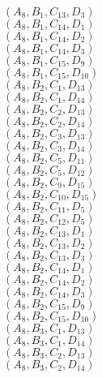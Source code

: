 \documentclass[14pt]{article}
\begin{document}
    $({A}_{8}, {B}_{1}, {C}_{13}, {D}_{3}) $ \\ 
    $({A}_{8}, {B}_{1}, {C}_{14}, {D}_{1}) $ \\ 
    $({A}_{8}, {B}_{1}, {C}_{14}, {D}_{2}) $ \\ 
    $({A}_{8}, {B}_{1}, {C}_{14}, {D}_{3}) $ \\ 
    $({A}_{8}, {B}_{1}, {C}_{15}, {D}_{9}) $ \\ 
    $({A}_{8}, {B}_{1}, {C}_{15}, {D}_{10}) $ \\ 
    $({A}_{8}, {B}_{2}, {C}_{1}, {D}_{13}) $ \\ 
    $({A}_{8}, {B}_{2}, {C}_{1}, {D}_{14}) $ \\ 
    $({A}_{8}, {B}_{2}, {C}_{2}, {D}_{13}) $ \\ 
    $({A}_{8}, {B}_{2}, {C}_{2}, {D}_{14}) $ \\ 
    $({A}_{8}, {B}_{2}, {C}_{3}, {D}_{13}) $ \\ 
    $({A}_{8}, {B}_{2}, {C}_{3}, {D}_{14}) $ \\ 
    $({A}_{8}, {B}_{2}, {C}_{5}, {D}_{11}) $ \\ 
    $({A}_{8}, {B}_{2}, {C}_{5}, {D}_{12}) $ \\ 
    $({A}_{8}, {B}_{2}, {C}_{9}, {D}_{15}) $ \\ 
    $({A}_{8}, {B}_{2}, {C}_{10}, {D}_{15}) $ \\ 
    $({A}_{8}, {B}_{2}, {C}_{11}, {D}_{5}) $ \\ 
    $({A}_{8}, {B}_{2}, {C}_{12}, {D}_{5}) $ \\ 
    $({A}_{8}, {B}_{2}, {C}_{13}, {D}_{1}) $ \\ 
    $({A}_{8}, {B}_{2}, {C}_{13}, {D}_{2}) $ \\ 
    $({A}_{8}, {B}_{2}, {C}_{13}, {D}_{3}) $ \\ 
    $({A}_{8}, {B}_{2}, {C}_{14}, {D}_{1}) $ \\ 
    $({A}_{8}, {B}_{2}, {C}_{14}, {D}_{2}) $ \\ 
    $({A}_{8}, {B}_{2}, {C}_{14}, {D}_{3}) $ \\ 
    $({A}_{8}, {B}_{2}, {C}_{15}, {D}_{9}) $ \\ 
    $({A}_{8}, {B}_{2}, {C}_{15}, {D}_{10}) $ \\ 
    $({A}_{8}, {B}_{3}, {C}_{1}, {D}_{13}) $ \\ 
    $({A}_{8}, {B}_{3}, {C}_{1}, {D}_{14}) $ \\ 
    $({A}_{8}, {B}_{3}, {C}_{2}, {D}_{13}) $ \\ 
    $({A}_{8}, {B}_{3}, {C}_{2}, {D}_{14}) $ \\ 
\end{document}
